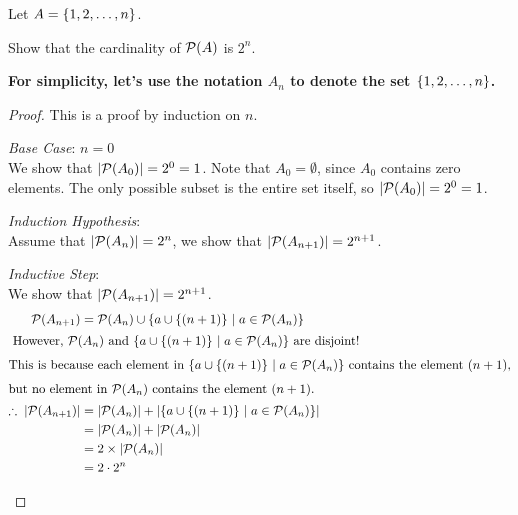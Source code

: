 \begin{problem}
  Let $A = \left\{1, 2, \ldots, n\right\}$.
  \begin{enumalph}
    \item Show that the cardinality of $\mathcal{P}(A)$ is $2^n$.
      \begin{answer}
        \textbf{For simplicity, let's use the notation
        $A_n$ to denote the set $\left\{1, 2, \ldots, n\right\}$.}
        \begin{proof}
          This is a proof by induction on $n$.

          \begin{enumroman}
            \item \emph{Base Case}: $n = 0$\\
              We show that $\lvert\mathcal{P}(A_0)\rvert = 2^0 = 1$.
              Note that $A_0 = \emptyset$, since $A_0$ contains
              zero elements. The only possible subset is the entire set
              itself, so $\lvert\mathcal{P}(A_0)\rvert = 2^0 = 1$.
            \item \emph{Induction Hypothesis}: \\
              Assume that $\lvert\mathcal{P}(A_n)\rvert = 2^n$,
              we show that $\lvert\mathcal{P}(A_{n+1})\rvert = 2^{n+1}$.
            \item \emph{Inductive Step}:\\
              We show that $\lvert\mathcal{P}(A_{n+1})\rvert = 2^{n+1}$.
              \begin{align*}
                \calP(A_{n+1}) &= \calP(A_n) \cup \set{a \cup \set{(n+1)}\, |\; a \in \calP(A_n)} \\
                \intertext{
                  However, $\calP(A_n)$ and $\set{a \cup \set{(n+1)}\, |\; a \in \calP(A_n)}$
                  are disjoint!}
                \intertext{This is because each element in
                  $\set{a \cup \set{(n+1)}\, |\; a \in \calP(A_n)}$ contains
                  the element $(n+1)$,}
                \intertext{but no element in $\calP(A_n)$ contains
                  the element $(n+1)$.
                }
                \Therefore \abs{\calP(A_{n+1})} &= \abs{\calP(A_n)} + \abs{\set{a \cup \set{(n+1)}\, |\; a \in \calP(A_n)}} \\
                                                &= \abs{\calP(A_n)} + \abs{\calP(A_n)} \\
                                                &= 2 \times \abs{\calP(A_n)} \\
                                                &= 2 \cdot 2^n \\

\end{align*}
\end{enumroman}
\end{proof}
\end{answer}
\end{enumalph}
\end{problem}
